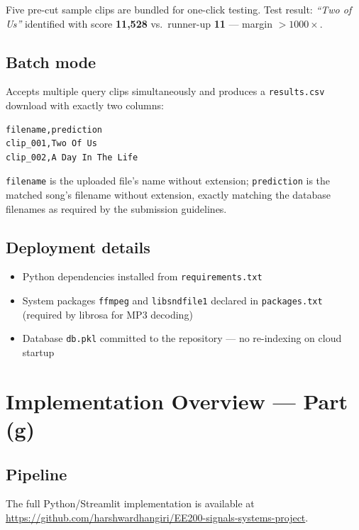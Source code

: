 \documentclass[11pt,a4paper]{article}
\begin{document}
Five pre-cut sample clips are bundled for one-click testing.
Test result: \textit{``Two of Us''} identified with score \textbf{11{,}528}
vs.\ runner-up \textbf{11} — margin $>1000\times$.

\subsection{Batch mode}

Accepts multiple query clips simultaneously and produces a
\texttt{results.csv} download with exactly two columns:

\begin{lstlisting}
filename,prediction
clip_001,Two Of Us
clip_002,A Day In The Life
\end{lstlisting}

\texttt{filename} is the uploaded file's name without extension;
\texttt{prediction} is the matched song's filename without extension, exactly
matching the database filenames as required by the submission guidelines.

\subsection{Deployment details}

\begin{itemize}[noitemsep]
  \item Python dependencies installed from \texttt{requirements.txt}
  \item System packages \texttt{ffmpeg} and \texttt{libsndfile1} declared in
        \texttt{packages.txt} (required by librosa for MP3 decoding)
  \item Database \texttt{db.pkl} committed to the repository — no re-indexing
        on cloud startup
\end{itemize}

\section{Implementation Overview — Part (g)}

\subsection{Pipeline}

The full Python/Streamlit implementation is available at
\url{https://github.com/harshwardhangiri/EE200-signals-systems-project}.
\end{document}
